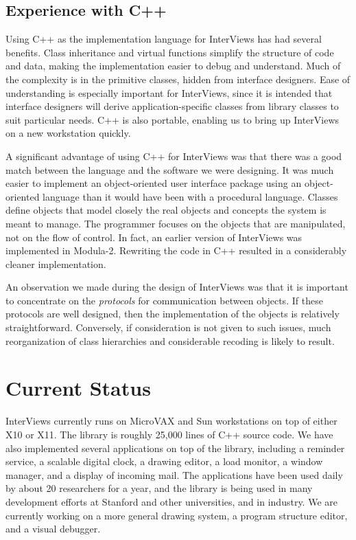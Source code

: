 \subsection{Experience with C++}
Using C++ as the implementation language for InterViews
has had several benefits.
Class inheritance and virtual functions simplify the structure
of code and data, making the implementation
easier to debug and understand.  Much of the complexity is in the
primitive classes, hidden from interface designers.
Ease of understanding is especially important for InterViews, since it is
intended that interface designers will derive application-specific classes
from library classes to suit particular needs.
C++ is also portable, enabling us to bring up InterViews
on a new workstation quickly.

A significant advantage of using C++ for InterViews was that there was a good
match between the language and the software we were designing.  It was much
easier to implement an object-oriented user interface package using an
object-oriented language than it would have been with a procedural language.
Classes define objects that model closely the real objects and
concepts the system is meant to manage.  The programmer focuses on
the objects that are manipulated, not on the flow of control.
In fact, an earlier version of InterViews was implemented in Modula-2.
Rewriting the code in C++ resulted in a considerably cleaner implementation.

An observation we made during the design of InterViews
was that it is important to concentrate on the {\em protocols} for
communication between objects.  If these protocols
are well designed, then the implementation of the objects is relatively
straightforward.  Conversely, if consideration is not given to such issues,
much reorganization of class hierarchies and considerable recoding is
likely to result.

\section{Current Status}
InterViews currently runs on MicroVAX and Sun workstations on top of
either X10 or X11.
The library is roughly 25,000 lines of C++ source code.
We have also implemented several applications on top of the library,
including a reminder service, a scalable digital clock,
a drawing editor, a load monitor, a window manager, and a display
of incoming mail.  The applications have been used daily by about 20
researchers for a year, and the library is being used in many
development efforts at Stanford and other universities, and in industry.
We are currently working on a more general drawing system, a program
structure editor, and a visual debugger.

